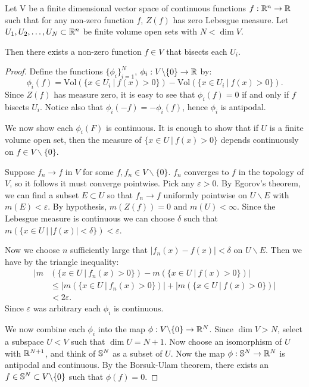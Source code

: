 \begin{theorem}
Let V be a finite dimensional vector space of continuous functions $f:\mathbb R^n \to \mathbb R$ such that for any non-zero function $f$,
 $Z(f)$ has zero Lebesgue measure. 
Let $U_1,U_2,\dots,U_N \subset \mathbb R^n$ be finite volume open sets with $N< \dim V$. 

Then there exists a non-zero function $f \in V$ that bisects each $U_i$. \label{thm:GenHamSand}
\end{theorem}
\begin{proof}

Define the functions $\{\phi_i\}_{i=1}^N$, $\phi_i: V\backslash \{0\} \to \mathbb R$ by:
\[
\phi_i(f) = \text{Vol}(\{x\in U_i \ | \ f(x) > 0 \}) - \text{Vol}(\{x\in U_i \ |\ f(x) > 0 \}).
\]
Since $Z(f)$ has measure zero, it is easy to see that $\phi_i(f) = 0$ if and only if $f$ bisects $U_i$. 
Notice also that $\phi_i(-f) = -\phi_i(f)$, hence $\phi_i$ is antipodal. 

We now show each $\phi_i(F)$ is continuous.
It is enough to show that if $U$ is a finite volume open set, then the measure of $\{x\in U\ |\ f(x)>0\}$ depends continuously on $f\in V \backslash \{0\}$.

Suppose $f_n \to f$ in $V$ for some $f,f_n \in V \backslash \{0\}$. $f_n$ converges to $f$ in the topology of $V$, 
so it follows it must converge pointwise. Pick any $\varepsilon >0$. 
By Egorov's theorem, we can find a subset $E\subset U$ so that $f_n \to f$ uniformly pointwise on $U \backslash E$ with $m(E)< \varepsilon$.
By hypothesis, $m(Z(f)) =0$ and $m(U) < \infty$. 
Since the Lebesgue measure is continuous we can choose $\delta$ such that $m\left(\{x\in U\ \big |\ |f(x)|<\delta\}\right) < \varepsilon$.

Now we choose $n$ sufficiently large that $|f_n (x) - f(x)| < \delta$ on $U\backslash E$. Then we have by the triangle inequality:
\begin{align*}
    |m&\left(\{x\in U \ |\ f_n(x)>0\}\right) - m\left(\{x\in U\ |\ f(x)>0\}\right)| \\
    &\leq |m\left(\{x\in U\ |\ f_n(x)>0\}\right)| + |m\left(\{x\in U\ |\ f(x)>0\}\right)| \\
    &< 2 \varepsilon.
\end{align*}
Since $\varepsilon$ was arbitrary each $\phi_i$ is continuous.

We now combine each $\phi_i$ into the map $\phi : V\backslash \{0\} \to \mathbb R^N$. Since $\dim V > N$, select a subspace $U < V$ such that $\dim U = N+1$. 
Now choose an isomorphism of $U$ with $\mathbb R^{N+1}$, and think of $\mathbb S^N$ as a subset of $U$.
Now the map $\phi: \mathbb S^N \to \mathbb R^N$ is antipodal and continuous. 
By the Borsuk-Ulam theorem, there exists an $f\in \mathbb S^N \subset V\backslash \{0\}$ such that $\phi(f) = 0$.
\end{proof}


